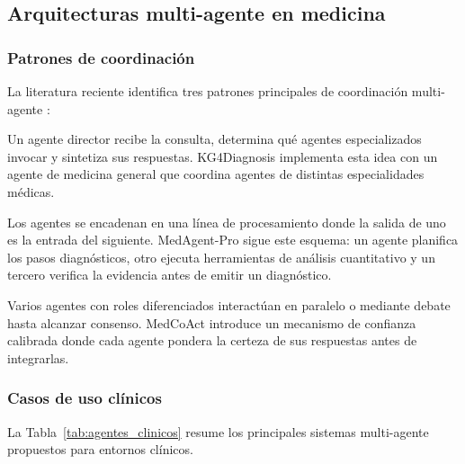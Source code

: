 \subsection{Arquitecturas multi-agente en medicina}
\label{subsec:multiagente_medicina}

\subsubsection{Patrones de coordinación}

La literatura reciente identifica tres patrones principales de coordinación multi-agente \parencite{Plaat2025AgenticSurvey,Wang2024SurveyAgents}:

\begin{description}[nosep]
    \item[Supervisor centralizado.] Un agente director recibe la consulta, determina qué agentes especializados invocar y sintetiza sus respuestas. KG4Diagnosis \parencite{Zuo2025KG4Diagnosis} implementa esta idea con un agente de medicina general que coordina agentes de distintas especialidades médicas.
    \item[Pipeline secuencial.] Los agentes se encadenan en una línea de procesamiento donde la salida de uno es la entrada del siguiente. MedAgent-Pro \parencite{Wang2025MedAgentPro} sigue este esquema: un agente planifica los pasos diagnósticos, otro ejecuta herramientas de análisis cuantitativo y un tercero verifica la evidencia antes de emitir un diagnóstico.
    \item[Especialización colaborativa.] Varios agentes con roles diferenciados interactúan en paralelo o mediante debate hasta alcanzar consenso. MedCoAct \parencite{Zheng2025MedCoAct} introduce un mecanismo de confianza calibrada donde cada agente pondera la certeza de sus respuestas antes de integrarlas.
\end{description}

\subsubsection{Casos de uso clínicos}

La Tabla~\ref{tab:agentes_clinicos} resume los principales sistemas multi-agente propuestos para entornos clínicos.

